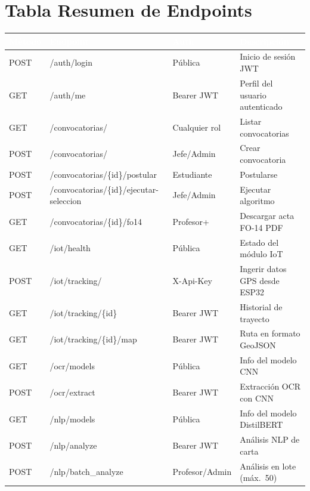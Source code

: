 \documentclass[12pt,a4paper,twoside]{report}
\begin{document}
\section{Tabla Resumen de Endpoints}
\begin{center}
\begin{tabularx}{\textwidth}{|l|p{5.5cm}|p{2.8cm}|X|}
\hline
\rowcolor{tableHdr}
\textcolor{white}{\textbf{Método}} & \textcolor{white}{\textbf{Endpoint}} &
\textcolor{white}{\textbf{Auth}} & \textcolor{white}{\textbf{Descripción}} \\
\hline
\rowcolor{rowOdd}POST & /auth/login & Pública & Inicio de sesión JWT \\
\hline\rowcolor{rowEven}GET & /auth/me & Bearer JWT & Perfil del usuario autenticado \\
\hline\rowcolor{rowOdd}GET & /convocatorias/ & Cualquier rol & Listar convocatorias \\
\hline\rowcolor{rowEven}POST & /convocatorias/ & Jefe/Admin & Crear convocatoria \\
\hline\rowcolor{rowOdd}POST & /convocatorias/\{id\}/postular & Estudiante & Postularse \\
\hline\rowcolor{rowEven}POST & /convocatorias/\{id\}/ejecutar-seleccion & Jefe/Admin & Ejecutar algoritmo \\
\hline\rowcolor{rowOdd}GET & /convocatorias/\{id\}/fo14 & Profesor+ & Descargar acta FO-14 PDF \\
\hline\rowcolor{rowEven}GET & /iot/health & Pública & Estado del módulo IoT \\
\hline\rowcolor{rowOdd}POST & /iot/tracking/ & X-Api-Key & Ingerir datos GPS desde ESP32 \\
\hline\rowcolor{rowEven}GET & /iot/tracking/\{id\} & Bearer JWT & Historial de trayecto \\
\hline\rowcolor{rowOdd}GET & /iot/tracking/\{id\}/map & Bearer JWT & Ruta en formato GeoJSON \\
\hline\rowcolor{rowEven}GET & /ocr/models & Pública & Info del modelo CNN \\
\hline\rowcolor{rowOdd}POST & /ocr/extract & Bearer JWT & Extracción OCR con CNN \\
\hline\rowcolor{rowEven}GET & /nlp/models & Pública & Info del modelo DistilBERT \\
\hline\rowcolor{rowOdd}POST & /nlp/analyze & Bearer JWT & Análisis NLP de carta \\
\hline\rowcolor{rowEven}POST & /nlp/batch\_analyze & Profesor/Admin & Análisis en lote (máx.\ 50) \\
\hline
\end{tabularx}
\end{center}
\end{document}
